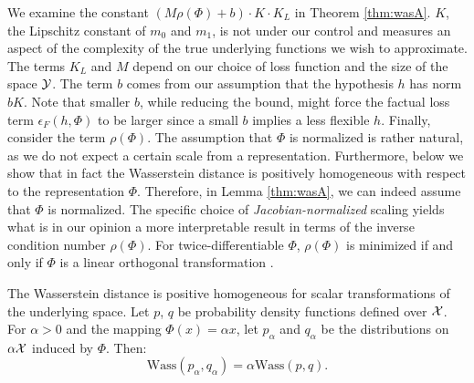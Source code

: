 We examine the constant $\left(M \rho(\Phi) +b\right) \cdot K \cdot K_L$ in Theorem \ref{thm:wasA}. $K$, the Lipschitz constant of $m_0$ and $m_1$, is not under our control and measures an aspect of the complexity of the true underlying functions we wish to approximate. The terms $K_L$ and $M$ depend on our choice of loss function and the size of the space $\mathcal Y$. The term $b$ comes from our assumption that the hypothesis $h$ has norm $ b K$. Note that smaller $b$, while reducing the bound, might force the factual loss term $\epsilon_F(h,\Phi)$ to be larger since a small $b$ implies a less flexible $h$. Finally, consider the term $\rho(\Phi)$.
The assumption that $\Phi$ is normalized is rather natural, as we do not expect a certain scale from a representation. Furthermore, below we show that in fact the Wasserstein distance is positively homogeneous with respect to the representation $\Phi$. Therefore, in Lemma \ref{thm:wasA}, we can indeed assume that $\Phi$ is normalized. The specific choice of \emph{Jacobian-normalized} scaling yields what is in our opinion a more interpretable result in terms of the inverse condition number $\rho(\Phi)$. For twice-differentiable $\Phi$, $\rho(\Phi)$ is minimized if and only if $\Phi$ is a linear orthogonal transformation \cite{mathover}. %

\begin{thmapplem}\label{lem:wassinvar}
The Wasserstein distance is positive homogeneous for scalar transformations of the underlying space. Let $p$, $q$ be probability density functions defined over $\mathcal X$. For $\alpha>0$ and
 the mapping $\Phi(x) = \alpha x$, let $p_\alpha$ and $q_\alpha$ be the distributions on $\alpha\mathcal X$ induced by $\Phi$. Then:
$$\text{Wass}\left(p_{\alpha  },q_{\alpha  }\right) = \alpha\text{Wass}\left(p,q\right).$$
\end{thmapplem}

